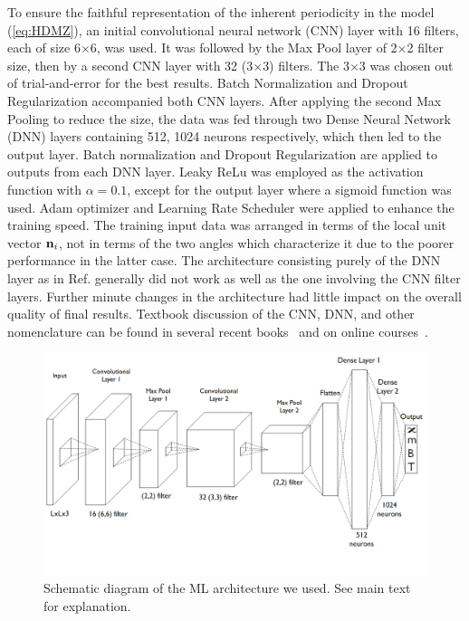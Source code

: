 \documentclass[reprint,amsmath,amssymb,aps,showpacs,superscriptaddress,prl]{revtex4-1}
\renewcommand{\v}[1]{{\bf #1}}
\begin{document}
To ensure the faithful representation of the  inherent periodicity in the model (\ref{eq:HDMZ}), an initial convolutional neural network (CNN) layer with 16 filters, each of size 6$\times$6, was used. It was followed by the Max Pool layer of 2$\times$2 filter size, then by a second CNN layer with 32 (3$\times$3) filters.  The 3$\times$3 was chosen out of trial-and-error for the best results. Batch Normalization and Dropout Regularization accompanied both CNN layers. After applying the second Max Pooling to reduce the size, the data was fed through two Dense Neural Network (DNN) layers containing 512, 1024 neurons respectively, which then led to the output layer. Batch normalization and Dropout Regularization are applied to outputs from each DNN layer. Leaky ReLu was employed as the activation function with $\alpha=0.1$, except for the output layer where a sigmoid function was used. Adam optimizer and Learning Rate Scheduler were applied to enhance the training speed.  The training input data was arranged in terms of the local unit vector $\v n_i$, not in terms of the two angles which characterize it due to the poorer performance in the latter case. The architecture consisting purely of the DNN layer as in Ref. \cite{russian18} generally did not work as well as the one involving the CNN filter layers. Further minute changes in the architecture had little impact on the overall quality of final results. Textbook discussion of the CNN, DNN, and other nomenclature can be found in several recent books~\cite{bishop,goodfellow} and on online courses~\cite{ng}.

\begin{figure}[ht]
\includegraphics[scale=0.35]{fig1.png}
\caption{Schematic diagram of the ML architecture we used. See main text for explanation.}\label{fig:1}
\end{figure}
\end{document}
